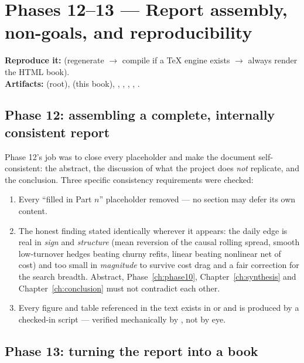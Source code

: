 \section{Phases 12--13 --- Report assembly, non-goals, and reproducibility}
\label{ch:phase12}

\textbf{Reproduce it:}  (regenerate $\to$ compile if
a TeX engine exists $\to$ always render the HTML book).\\
\textbf{Artifacts:}  (root),  (this
book), , ,
, , .

\subsection{Phase 12: assembling a complete, internally consistent report}

Phase 12's job was to close every placeholder and make the document self-consistent: the
abstract, the discussion of what the project does \emph{not} replicate, and the conclusion.
Three specific consistency requirements were checked:
\begin{enumerate}
  \item Every ``filled in Part $n$'' placeholder removed --- no section may defer its own
    content.
  \item The honest finding stated identically wherever it appears: the daily edge is real in
    \emph{sign} and \emph{structure} (mean reversion of the causal rolling spread, smooth
    low-turnover hedges beating churny refits, linear beating nonlinear net of cost) and too
    small in \emph{magnitude} to survive cost drag and a fair correction for the search
    breadth. Abstract, Phase~\ref{ch:phase10}, Chapter~\ref{ch:synthesis} and
    Chapter~\ref{ch:conclusion} must not contradict each other.
  \item Every figure and table referenced in the text exists in  or
     and is produced by a checked-in script --- verified mechanically
    by , not by eye.
\end{enumerate}

\subsection{Phase 13: turning the report into a book}

